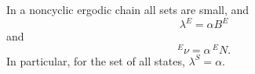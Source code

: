 In a noncyclic ergodic chain all sets are small, and
$$\lambda^E = \alpha B^E$$
and
$$^{E}\!\nu = \alpha\,^{E}\!N.$$
In particular, for the set of all states, $\lambda^S = \alpha$.
